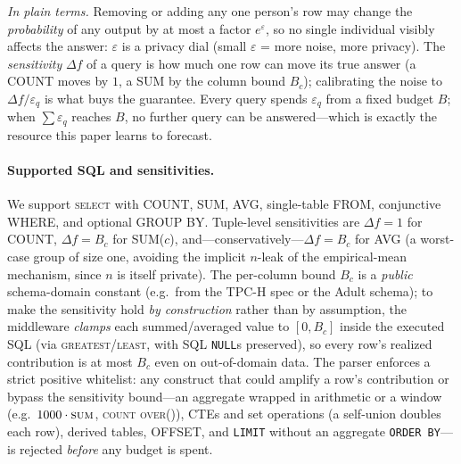 \documentclass[sigconf,nonacm]{acmart}
\newcommand{\eps}{\varepsilon}
\begin{document}
\noindent\emph{In plain terms.} Removing or adding any one person's row may change the \emph{probability} of any output by at most a factor $e^\eps$, so no single individual visibly affects the answer: $\eps$ is a privacy dial (small $\eps$ = more noise, more privacy). The \emph{sensitivity} $\Delta f$ of a query is how much one row can move its true answer (a COUNT moves by $1$, a SUM by the column bound $B_c$); calibrating the noise to $\Delta f/\eps_q$ is what buys the guarantee. Every query spends $\eps_q$ from a fixed budget $B$; when $\sum\eps_q$ reaches $B$, no further query can be answered---which is exactly the resource this paper learns to forecast.

\paragraph{Supported SQL and sensitivities.}
We support \textsc{select} with COUNT, SUM, AVG, single-table FROM, conjunctive WHERE, and optional GROUP BY. Tuple-level sensitivities are $\Delta f=1$ for COUNT, $\Delta f=B_c$ for SUM($c$), and---conservatively---$\Delta f=B_c$ for AVG (a worst-case group of size one, avoiding the implicit $n$-leak of the empirical-mean mechanism, since $n$ is itself private). The per-column bound $B_c$ is a \emph{public} schema-domain constant (e.g.\ from the TPC-H spec or the Adult schema); to make the sensitivity hold \emph{by construction} rather than by assumption, the middleware \emph{clamps} each summed/averaged value to $[0,B_c]$ inside the executed SQL (via \textsc{greatest}/\textsc{least}, with SQL \texttt{NULL}s preserved), so every row's realized contribution is at most $B_c$ even on out-of-domain data. The parser enforces a strict positive whitelist: any construct that could amplify a row's contribution or bypass the sensitivity bound---an aggregate wrapped in arithmetic or a window (e.g.\ $1000\cdot\textsc{sum}$, \textsc{count} \textsc{over}()), CTEs and set operations (a self-union doubles each row), derived tables, OFFSET, and \texttt{LIMIT} without an aggregate \texttt{ORDER BY}---is rejected \emph{before} any budget is spent.
\end{document}
